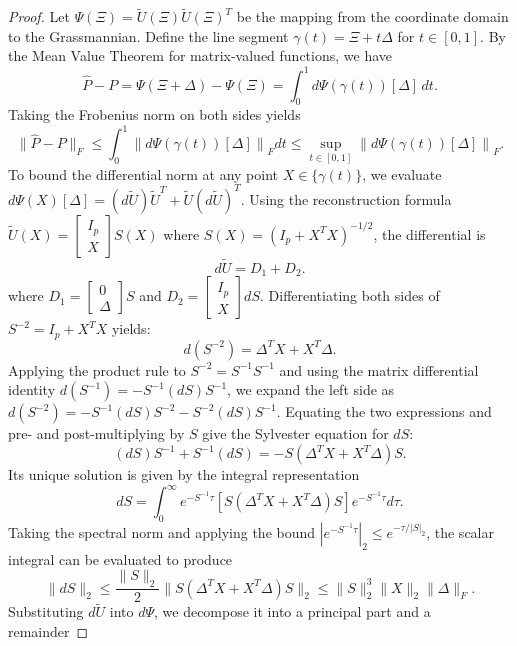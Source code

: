 \documentclass[11pt]{article}
\begin{document}
\begin{proof}
Let $\Psi(\Xi) = \widetilde{U}(\Xi)\widetilde{U}(\Xi)^T$ be the mapping from the coordinate domain to the Grassmannian. Define the line segment $\gamma(t) = \Xi + t\Delta$ for $t \in [0,1]$. By the Mean Value Theorem for matrix-valued functions, we have
 $$
\hat{P} - P = \Psi(\Xi + \Delta) - \Psi(\Xi) = \int_0^1 d\Psi(\gamma(t))[\Delta] \, dt.
 $$
Taking the Frobenius norm on both sides yields
\begin{equation}
\|\hat{P} - P\|_F \leq \int_0^1 \left\| d\Psi(\gamma(t))[\Delta] \right\|_F dt \leq \sup_{t \in [0,1]} \left\| d\Psi(\gamma(t))[\Delta] \right\|_F. \label{eq:norm_integral}
\end{equation}
To bound the differential norm at any point $X \in \{\gamma(t)\}$, we evaluate $d\Psi(X)[\Delta] = (d\widetilde U)\widetilde U^T + \widetilde U(d\widetilde U)^T$. Using the reconstruction formula $\widetilde U(X) = \begin{bmatrix} I_p \\ X \end{bmatrix} S(X)$ where $S(X) = (I_p + X^T X)^{-1/2}$, the differential is
\begin{equation} \label{eq:du_exact_rigorous}
d\widetilde U = D_1 + D_2.
\end{equation}
where  $D_1 = \begin{bmatrix} 0 \\ \Delta \end{bmatrix} S$ and $D_2 = \begin{bmatrix} I_p \\ X \end{bmatrix} dS$.
Differentiating both sides of $S^{-2} = I_p + X^T X$ yields:
$$ d(S^{-2}) = \Delta^T X + X^T \Delta. $$
Applying the product rule to $S^{-2} = S^{-1}S^{-1}$ and using the matrix differential identity $d(S^{-1}) = -S^{-1}(dS)S^{-1}$, we expand the left side as
$ d(S^{-2})  = -S^{-1}(dS)S^{-2} - S^{-2}(dS)S^{-1}. $
Equating the two expressions and pre- and post-multiplying by $S$ give the Sylvester equation for $dS$:
$$ (dS)S^{-1} + S^{-1}(dS) = -S(\Delta^T X + X^T \Delta)S. $$
Its unique solution is given by the integral representation
$$ dS = \int_0^\infty e^{-S^{-1}\tau} [S(\Delta^T X + X^T \Delta)S] e^{-S^{-1}\tau} d\tau. $$
Taking the spectral norm and applying the bound $|e^{-S^{-1}\tau}|_2 \le e^{-\tau/|S|_2}$, the scalar integral can be evaluated to produce
$$ \|dS\|_2 \le \frac{\|S\|_2}{2} \|S(\Delta^T X + X^T \Delta)S\|_2 \le \|S\|_2^3 \|X\|_2 \|\Delta\|_F. $$
Substituting $d\tilde{U}$ into $d\Psi$, we decompose it into a principal part and a remainder

\end{proof}
\end{document}
